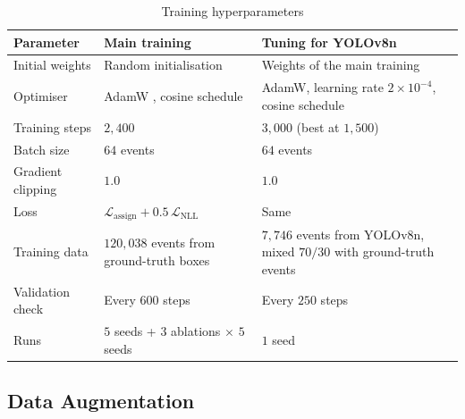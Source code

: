 \begin{table}[H]
    \centering
    \caption{Training hyperparameters}
    \label{tab:train_hparams}
    \begin{tabularx}{\textwidth}{l X X}
        \toprule
        \textbf{Parameter} & \textbf{Main training} & \textbf{Tuning for YOLOv8n} \\
        \midrule
        Initial weights & Random initialisation & Weights of the main training \\
        Optimiser & AdamW \cite{loshchilov2019adamw}, cosine schedule & AdamW, learning rate $2\times10^{-4}$, cosine schedule \\
        Training steps & $2{,}400$ & $3{,}000$ (best at $1{,}500$) \\
        Batch size & $64$ events & $64$ events \\
        Gradient clipping & $1.0$ & $1.0$ \\
        Loss & $\mathcal{L}_{\text{assign}} + 0.5\,\mathcal{L}_{\text{NLL}}$ & Same \\
        Training data & $120{,}038$ events from ground-truth boxes & $7{,}746$ events from YOLOv8n, mixed $70/30$ with ground-truth events \\
        Validation check & Every $600$ steps & Every $250$ steps \\
        Runs & $5$ seeds + $3$ ablations $\times$ $5$ seeds & $1$ seed \\
        \bottomrule
    \end{tabularx}
\end{table}

\subsection{Data Augmentation}
\label{sec:data_augmentation}

